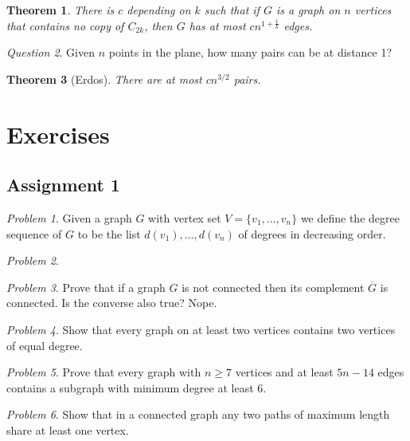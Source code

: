 \documentclass[11pt, fleqn, a4paper, landscape]{article}
\theoremstyle{plain} %
\newtheorem{thm}{Theorem}
\theoremstyle{remark} %
\newtheorem{que}[thm]{Question}
\newtheorem{problem}{Problem}
\theoremstyle{definition} %
\begin{document}
\begin{multicols}{3}
\begin{thm}
There is $c$ depending on $k$ such that if $G$ is a graph on $n$ vertices that contains no copy of $C_{2k}$, then $G$ has at most $cn^{1+\frac{1}{k}}$ edges.
\end{thm}

\begin{que}
Given $n$ points in the plane, how many pairs can be at distance 1?
\end{que}

\begin{thm}[Erdos]
There are at most $cn^{3/2}$ pairs.
\end{thm}

\section{Exercises}
\subsection{Assignment 1}

\begin{problem}
Given a graph $G$ with vertex set $V = \{v_1,\dots,v_n\}$ we define the degree sequence of $G$ to be the list $d(v_1),\dots, d(v_n)$ of degrees in decreasing order.
\end{problem}

\begin{problem}

\end{problem}

\begin{problem}
Prove that if a graph $G$ is not connected then its complement $\overline{G}$ is connected. Is the converse also true? Nope.
\end{problem}

\begin{problem}
Show that every graph on at least two vertices contains two vertices of equal
degree.
\end{problem}

\begin{problem}
Prove that every graph with $n \ge 7$ vertices and at least $5n- 14$ edges contains a subgraph with minimum degree at least 6.
\end{problem}

\begin{problem}
Show that in a connected graph any two paths of maximum length share at least
one vertex.
\end{problem}


\end{multicols}
\end{document}

